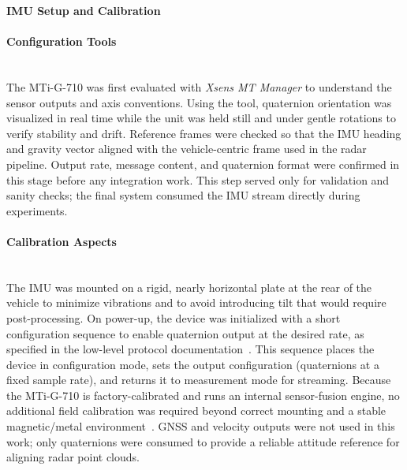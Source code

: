 \newpage
\noindent\textbf{IMU Setup and Calibration}
\label{sec:imu_setup_calibration}

\setcounter{paragraph}{0} %

\paragraph{Configuration Tools}
\hfill
\\
The MTi-G-710 was first evaluated with \textit{Xsens MT Manager} to understand the sensor outputs and axis conventions.  
Using the tool, quaternion orientation was visualized in real time while the unit was held still and under gentle rotations to verify stability and drift.  
Reference frames were checked so that the IMU heading and gravity vector aligned with the vehicle-centric frame used in the radar pipeline.  
Output rate, message content, and quaternion format were confirmed in this stage before any integration work.  
This step served only for validation and sanity checks; the final system consumed the IMU stream directly during experiments.  
\vspace{0.5em}
\paragraph{Calibration Aspects}
\hfill
\\
The IMU was mounted on a rigid, nearly horizontal plate at the rear of the vehicle to minimize vibrations and to avoid introducing tilt that would require post-processing.  
On power-up, the device was initialized with a short configuration sequence to enable quaternion output at the desired rate, as specified in the low-level protocol documentation~\cite{mti_lowlevel_doc}.  
This sequence places the device in configuration mode, sets the output configuration (quaternions at a fixed sample rate), and returns it to measurement mode for streaming.  
Because the MTi-G-710 is factory-calibrated and runs an internal sensor-fusion engine, no additional field calibration was required beyond correct mounting and a stable magnetic/metal environment~\cite{mti710_manual}.  
GNSS and velocity outputs were not used in this work; only quaternions were consumed to provide a reliable attitude reference for aligning radar point clouds.  
